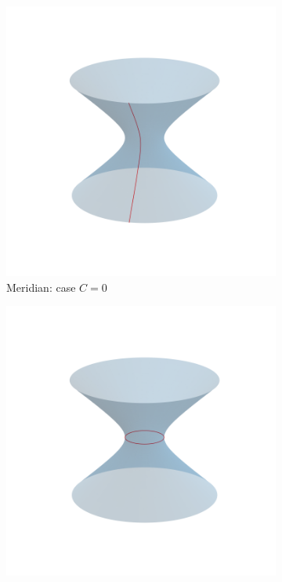 \documentclass[12pt]{article}
\begin{document}
\begin{figure}[ht]
	\centering
	\begin{subfigure}[b]{0.4\linewidth}
	  \centering
	  \includegraphics[width=1.0\textwidth]{images/h_merd1.png}
 	  \caption{Meridian: case $C=0$}
	  \label{subfig:vertical}
	\end{subfigure}
	\hfill
	\begin{subfigure}[b]{0.4\linewidth}
	  \centering
	  \includegraphics[width=1.0\textwidth]{images/h_circ1.png}

\end{subfigure}
\end{figure}
\end{document}
